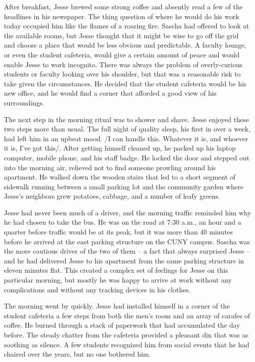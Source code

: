 After breakfast, Jesse brewed some strong coffee and absently read a few of the headlines in his newspaper.  The thing question of where he would do his work today occupied him like the flames of a roaring fire.  Sascha had offered to look at the available rooms, but Jesse thought that it might be wise to go off the grid and choose a place that would be less obvious and predictable.  A faculty lounge, or even the student cafeteria, would give a certain amount of peace and would enable Jesse to work incognito.  There was always the problem of overly-curious students or faculty looking over his shoulder, but that was a reasonable risk to take given the circumstances.  He decided that the student cafeteria would be his new office, and he would find a corner that afforded a good view of his surroundings.

The next step in the morning ritual was to shower and shave.  Jesse enjoyed these two steps more than usual.  The full night of quality sleep, his first in over a week, had left him in an upbeat mood.  /I can handle this.  Whatever it is, and whoever it is, I've got this/.  After getting himself cleaned up, he packed up his laptop computer, mobile phone, and his staff badge.  He locked the door and stepped out into the morning air, relieved not to find someone prowling around his apartment.  He walked down the wooden stairs that led to a short segment of sidewalk running between a small parking lot and the community garden where Jesse's neighbors grew potatoes, cabbage, and a number of leafy greens.

Jesse had never been much of a driver, and the morning traffic reminded him why he had chosen to take the bus.  He was on the road at 7:30 a.m., an hour and a quarter before traffic would be at its peak, but it was more than 40 minutes before he arrived at the east parking structure on the CUNY campus.  Sascha was the more cautious driver of the two of them -- a fact that always surprised Jesse -- and he had delivered Jesse to his apartment from the same parking structure in eleven minutes flat.  This created a complex set of feelings for Jesse on this particular morning, but mostly he was happy to arrive at work without any complications and without any tracking devices in his clothes.

The morning went by quickly.  Jesse had installed himself in a corner of the student cafeteria a few steps from both the men's room and an array of carafes of coffee.  He burned through a stack of paperwork that had accumulated the day before.  The steady chatter from the cafeteria provided a pleasant din that was as soothing as silence.  A few students recognized him from social events that he had chaired over the years, but no one bothered him.

